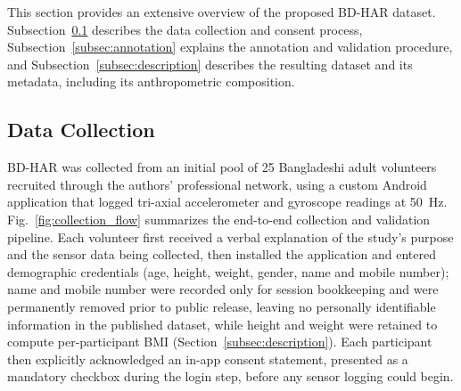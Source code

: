 \documentclass[conference]{IEEEtran}
\begin{document}
This section provides an extensive overview of the proposed BD-HAR
dataset. Subsection~\ref{subsec:datacollection} describes the data
collection and consent process, Subsection~\ref{subsec:annotation}
explains the annotation and validation procedure, and
Subsection~\ref{subsec:description} describes the resulting dataset
and its metadata, including its anthropometric composition.

\subsection{Data Collection}
\label{subsec:datacollection}
BD-HAR was collected from an initial pool of 25 Bangladeshi adult
volunteers recruited through the authors' professional network, using
a custom Android application that logged tri-axial accelerometer and
gyroscope readings at 50~Hz. Fig.~\ref{fig:collection_flow}
summarizes the end-to-end collection and validation pipeline. Each
volunteer first received a verbal explanation of the study's purpose
and the sensor data being collected, then installed the application
and entered demographic credentials (age, height, weight, gender,
name and mobile number); name and mobile number were recorded only
for session bookkeeping and were permanently removed prior to public
release, leaving no personally identifiable information in the
published dataset, while height and weight were retained to compute
per-participant BMI (Section~\ref{subsec:description}). Each
participant then explicitly acknowledged an in-app consent statement,
presented as a mandatory checkbox during the login step, before any
sensor logging could begin.
\end{document}
